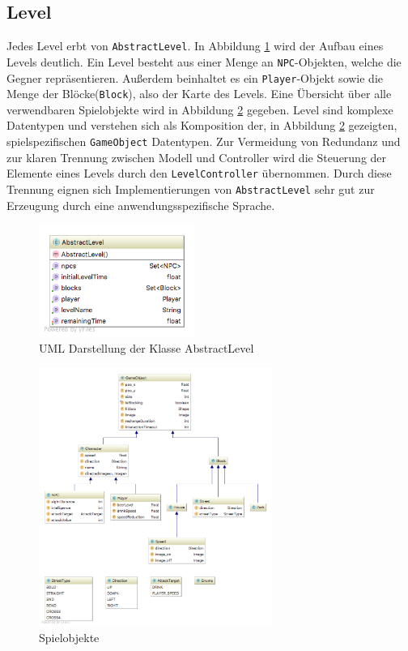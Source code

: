 \subsection{Level}

Jedes Level erbt von \texttt{AbstractLevel}.
In Abbildung \ref{fig:spielarchitektur:abstractlevel} wird der Aufbau eines Levels deutlich.
Ein Level besteht aus einer Menge an \texttt{NPC}-Objekten, welche die Gegner repräsentieren.
Außerdem beinhaltet es ein \texttt{Player}-Objekt sowie die Menge der Blöcke(\texttt{Block}), also der Karte des Levels.
Eine Übersicht über alle verwendbaren Spielobjekte wird in Abbildung \ref{fig:spielarchitektur:model} gegeben.
Level sind komplexe Datentypen und verstehen sich als Komposition der, in Abbildung \ref{fig:spielarchitektur:model} gezeigten, spielspezifischen \texttt{GameObject} Datentypen.
Zur Vermeidung von Redundanz und zur klaren Trennung zwischen Modell und Controller wird die Steuerung der Elemente eines Levels durch den \texttt{LevelController} übernommen.
Durch diese Trennung eignen sich Implementierungen von \texttt{AbstractLevel} sehr gut zur Erzeugung durch eine anwendungsspezifische Sprache.

\begin{figure}[]
\centering
\includegraphics[width=2in]{img/05_abstractlevel_uml.png}
\caption{UML Darstellung der Klasse AbstractLevel}
\label{fig:spielarchitektur:abstractlevel}
\end{figure}

\begin{figure}[]
\centering
\includegraphics[width=3in]{img/05_model.png}
\caption{Spielobjekte}
\label{fig:spielarchitektur:model}
\end{figure}

